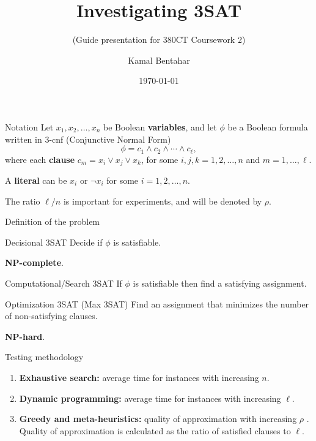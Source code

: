 \documentclass[aspectratio=169, compress, xcolor=table,xcolor=dvipsnames]{beamer}
\author{Kamal Bentahar}
\title{Investigating 3SAT}
\subtitle{(Guide presentation for 380CT Coursework 2)}
\date{\today}
\newcommand{\cnpc}{\textbf{NP-complete}}
\newcommand{\cnph}{\textbf{NP-hard}}
\begin{document}
\begin{frame}[noframenumbering]
	\titlepage
\end{frame}
	
\begin{frame}{Notation}
	Let $x_1,x_2,\ldots,x_n$ be Boolean \textbf{variables}, and let $\phi$ be a Boolean formula written in 3-cnf (Conjunctive Normal Form)
	\[
	\phi = c_1\land c_2\land \cdots \land c_\ell,
	\]
where each \textbf{clause} $c_m=x_i\lor x_j\lor x_k$, for some $i,j,k=1,2,\ldots,n$ and $m=1,\ldots,\ell$.

\vfill
A \textbf{literal} can be $x_i$ or $\lnot x_i$ for some $i=1,2,\ldots,n$.

\vfill
The ratio $\ell/n$ is important for experiments, and will be denoted by $\rho$.
\end{frame}

\begin{frame}{Definition of the problem}


	\begin{block}{Decisional 3SAT}
		Decide if $\phi$ is satisfiable.
	\end{block}
	\cnpc.

	\begin{block}{Computational/Search 3SAT}
		If $\phi$ is satisfiable then find a satisfying assignment.
	\end{block}

	\begin{block}{Optimization 3SAT (Max 3SAT)}
		Find an assignment that minimizes the number of non-satisfying clauses.
	\end{block}
	\cnph.
\end{frame}

\begin{frame}
{Testing methodology}

\begin{enumerate}
	\item \textbf{Exhaustive search:} average time for instances with increasing $n$.
	\item \textbf{Dynamic programming:} average time for instances with increasing $\ell$.
	\item \textbf{Greedy and meta-heuristics:} quality of approximation with increasing $\rho$ . Quality of approximation is calculated as the ratio of satisfied clauses to $\ell$.
\end{enumerate}
\end{frame}
\end{document}
